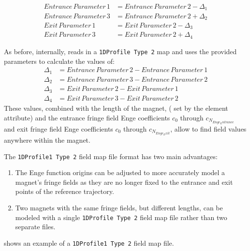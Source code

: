 \begin{align*}
  Entrance\,Parameter\,1 &= Entrance\,Parameter\,2 - \Delta_{1} \\
  Entrance\,Parameter\,3 &= Entrance\,Parameter\,2 + \Delta_{2} \\
  Exit\,Parameter\,1 &= Exit\,Parameter\,2 - \Delta_{3} \\
  Exit\,Parameter\,3 &= Exit\,Parameter\,2 + \Delta_{4}
\end{align*}

As before, internally, \opal reads in a \texttt{1DProfile Type 2} map and uses the provided parameters to calculate the values of:
\begin{align*}
\Delta_{1} &= Entrance\,Parameter\,2 - Entrance\,Parameter\,1 \\
\Delta_{2} &= Entrance\,Parameter\,3 - Entrance\,Parameter\,2 \\
\Delta_{3} &= Exit\,Parameter\,2 - Exit\,Parameter\,1 \\
\Delta_{4} &= Exit\,Parameter\,3 - Exit\,Parameter\,2
\end{align*}
These values, combined with the length of the magnet,  ( set by the element attribute) and the entrance fringe field Enge coefficients $c_0$ through $c_{N_{Enge_Entrance}}$ and exit fringe field Enge coefficients $c_0$ through $c_{N_{Enge_Exit}}$, allow \opal to find field values anywhere within the magnet.

The \texttt{1DProfile1 Type 2} field map file format has two main advantages:

\begin{enumerate}
\item The Enge function origins can be adjusted to more accurately model a magnet's fringe fields as they are no longer fixed to the entrance and exit points of the reference trajectory.
\item Two magnets with the same fringe fields, but different lengths, can be modeled with a single
  \texttt{1DProfile Type 2} field map file rather than two separate files.
\end{enumerate}
 shows an example of a \texttt{1DProfile1 Type 2} field map file.\\

